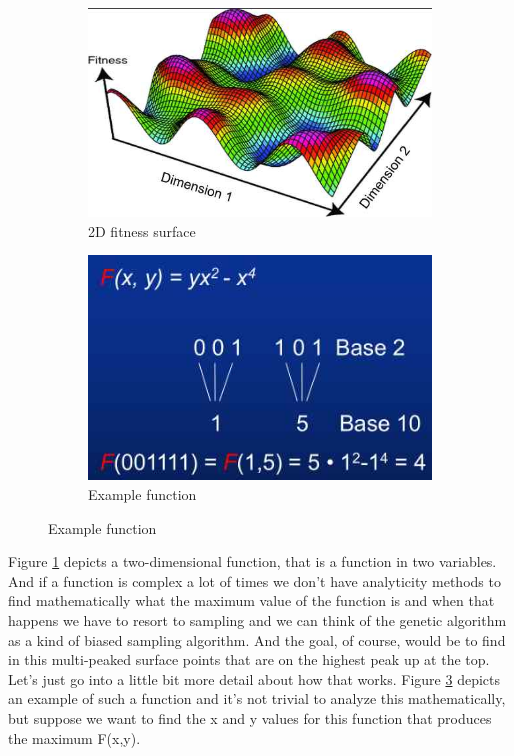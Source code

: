 \documentclass[]{article}
\begin{document}
\begin{figure}[H]
	\caption[Multi Parameter Optimization]{Multi Parameter Optimization\cite{marshall2014evolution}}\label{fig:multi-parameter-optimization}
	\begin{subfigure}[h]{0.5\textwidth}
	\caption{2D fitness surface\cite{marshall2014evolution}}\label{fig:multi-parameter-optimization-2d}
		\includegraphics[width=\textwidth]{multi-parameter-optimization}
	\end{subfigure}
	\begin{subfigure}[h]{0.45\textwidth}
		\caption{Example function}\label{fig:multi-parameter-optimization-example}
		\includegraphics[width=\textwidth]{multi-parameter-optimization-example}
	\end{subfigure}
\end{figure}

Figure \ref{fig:multi-parameter-optimization-2d} depicts
a two-dimensional function,
that is a function in two variables.
And if a function is complex a lot of times
we don't have analyticity methods to find mathematically
what the maximum value of the function is
and when that happens we have to resort to
sampling and we can think of the genetic algorithm
as a kind of biased sampling algorithm.
And the goal, of course, would be to find
in this multi-peaked surface points that
are on the highest peak up at the top.
Let's just go into a little bit more detail
about how that works.
Figure \ref{fig:multi-parameter-optimization-example} depicts an example of such a function and it's not trivial to analyze this mathematically,
but suppose we want to find the x and y values
for this function that produces the
maximum F(x,y).
\end{document}
